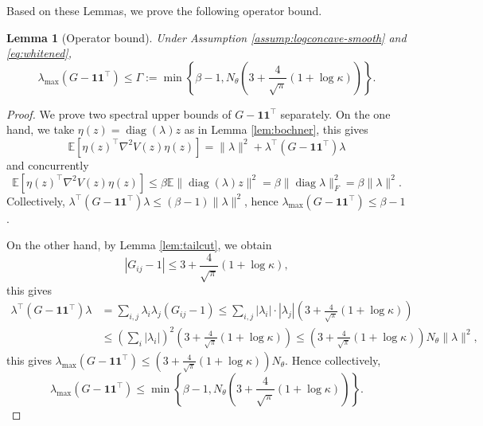 \documentclass[11pt]{article}
\theoremstyle{plain}
\newtheorem{lemma}[theorem]{Lemma}
\theoremstyle{definition}
\theoremstyle{remark}
\newcommand{\E}{\mathbb{E}}
\newcommand{\diag}{\operatorname{diag}}
\begin{document}
Based on these Lemmas, we prove the following operator bound.

\begin{lemma}[Operator bound]\label{lem:operator-bound}
    Under Assumption \ref{assump:logconcave-smooth} and \eqref{eq:whitened}, 
    \begin{equation*}
        \lambda_{\max} (G - \mathbf{1} \mathbf{1}^\top) \leq \Gamma := \min \left\{\beta - 1, N_\theta \left(3 + \frac{4}{\sqrt{\pi}} (1 + \log \kappa) \right) \right\}.
    \end{equation*}
\end{lemma}

\begin{proof}
    We prove two spectral upper bounds of $G - \mathbf{1} \mathbf{1}^\top$ separately. On the one hand, we take $\eta(z) = \diag (\lambda) z$ as in Lemma \ref{lem:bochner}, this gives
    \begin{equation*}
        \E[\eta(z)^\top \nabla^2 V (z) \eta (z)] = \|\lambda\|^2 + \lambda^\top (G - \mathbf{1} \mathbf{1}^\top) \lambda
    \end{equation*}
    and concurrently
    \begin{equation*}
        \E[\eta(z)^\top \nabla^2 V (z) \eta (z)] \leq \beta \E \|\diag (\lambda) z\|^2 = \beta \|\diag \lambda\|_F^2 = \beta \|\lambda\|^2.
    \end{equation*}
    Collectively, $\lambda^\top (G - \mathbf{1} \mathbf{1}^\top) \lambda \leq (\beta - 1) \|\lambda\|^2$, hence $\lambda_{\max} (G - \mathbf{1} \mathbf{1}^\top) \leq \beta - 1$.

    On the other hand, by Lemma \ref{lem:tailcut}, we obtain
    \begin{equation*}
        |G_{ij} - 1| \leq 3 + \frac{4}{\sqrt{\pi}} (1 + \log \kappa),
    \end{equation*}
    this gives
    \begin{align*}
        \lambda^\top (G - \mathbf{1} \mathbf{1}^\top) \lambda &= \sum_{i,j} \lambda_i \lambda_j (G_{ij} - 1) \leq \sum_{i, j} |\lambda_i| \cdot |\lambda_j| \left( 3 + \frac{4}{\sqrt{\pi}} (1 + \log \kappa) \right) \\
        &\leq \left( \sum_{i} |\lambda_i| \right)^2 \left( 3 + \frac{4}{\sqrt{\pi}} (1 + \log \kappa) \right) \leq  \left( 3 + \frac{4}{\sqrt{\pi}} (1 + \log \kappa) \right) N_\theta \|\lambda\|^2,
    \end{align*}
    this gives $\lambda_{\max} (G - \mathbf{1} \mathbf{1}^\top ) \leq \left( 3 + \frac{4}{\sqrt{\pi}} (1 + \log \kappa) \right) N_\theta$. Hence collectively,
    \begin{equation*}
        \lambda_{\max} (G - \mathbf{1} \mathbf{1}^\top) \leq \min \left\{\beta - 1, N_\theta \left(3 + \frac{4}{\sqrt{\pi}} (1 + \log \kappa) \right) \right\}.
    \end{equation*}
\end{proof}
\end{document}
